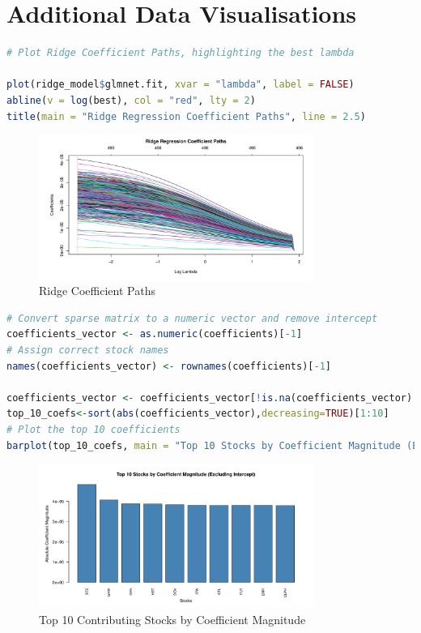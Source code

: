 \documentclass[12pt]{report} %
\begin{document}
\section{Additional Data Visualisations}

\begin{lstlisting}[language=R, breaklines=true, basicstyle=\ttfamily\small, columns=fullflexible]
# Plot Ridge Coefficient Paths, highlighting the best lambda

plot(ridge_model$glmnet.fit, xvar = "lambda", label = FALSE)
abline(v = log(best), col = "red", lty = 2)
title(main = "Ridge Regression Coefficient Paths", line = 2.5)
\end{lstlisting}

\begin{figure}[H]
    \centering
    \includegraphics[width=0.8\textwidth]{Coefficient Paths.pdf}
    \caption{Ridge Coefficient Paths}
    \label{fig:Coefficient_Paths}
\end{figure}

\begin{lstlisting}[language=R, breaklines=true, basicstyle=\ttfamily\small, columns=fullflexible]
# Convert sparse matrix to a numeric vector and remove intercept
coefficients_vector <- as.numeric(coefficients)[-1]
# Assign correct stock names
names(coefficients_vector) <- rownames(coefficients)[-1]  

coefficients_vector <- coefficients_vector[!is.na(coefficients_vector) & is.finite(coefficients_vector)] # Remove invalid
top_10_coefs<-sort(abs(coefficients_vector),decreasing=TRUE)[1:10]
# Plot the top 10 coefficients
barplot(top_10_coefs, main = "Top 10 Stocks by Coefficient Magnitude (Excluding Intercept)", xlab = "Stocks", las = 2,  col = "steelblue", cex.names = 0.8)
\end{lstlisting}

\begin{figure}[H]
    \centering
    \includegraphics[width=0.8\textwidth]{Top10.pdf}
    \caption{Top 10 Contributing Stocks by Coefficient Magnitude}
    \label{fig:Top10}
\end{figure}
\end{document}
